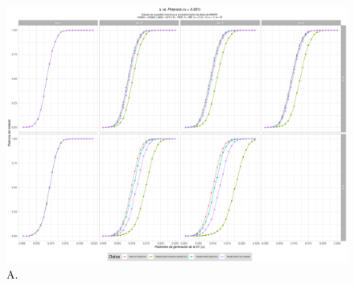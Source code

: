 \documentclass[IB,BIB]{TFUOC}%
\begin{document}
\begin{figure}[!htbp]
\hspace*{-0.8cm} %
    \centering
    \includegraphics[scale=.45]{OBJ2SimplexMANTAqloc0001.pdf}
    \caption{\scriptsize{A.}}
    \label{figAppend:OBJ2SimplexMANTAqloc0001}
\end{figure}
\end{document}
